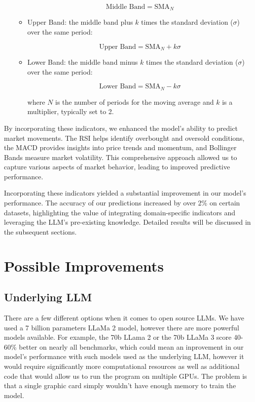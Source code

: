 \begin{itemize}
\begin{itemize}
		            \[
			            \text{Middle Band} = \text{SMA}_{N}
		            \]

		      \item Upper Band: the middle band plus \( k \) times the standard deviation (\( \sigma \)) over the same period:

		            \[
			            \text{Upper Band} = \text{SMA}_{N} + k\sigma
		            \]

		      \item Lower Band: the middle band minus \( k \) times the standard deviation (\( \sigma \)) over the same period:

		            \[
			            \text{Lower Band} = \text{SMA}_{N} - k\sigma
		            \]

		            where \( N \) is the number of periods for the moving average and \( k \) is a multiplier, typically set to 2.
	      \end{itemize}

\end{itemize}

By incorporating these indicators, we enhanced the model's ability to predict market movements. The RSI helps identify overbought and oversold conditions, the MACD provides insights into price trends and momentum, and Bollinger Bands measure market volatility. This comprehensive approach allowed us to capture various aspects of market behavior, leading to improved predictive performance.

Incorporating these indicators yielded a substantial improvement in our model's performance. The accuracy of our predictions increased by over 2\% on certain datasets, highlighting the value of integrating domain-specific indicators and leveraging the LLM's pre-existing knowledge. Detailed results will be discussed in the subsequent sections.

\section{Possible Improvements}

\subsection{Underlying LLM}
There are a few different options when it comes to open source LLMs. We have used a 7 billion parameters LLaMa 2 model, however there are more powerful models available. For example, the 70b LLama 2 or the 70b LLaMa 3 score 40-60\% better on nearly all benchmarks, which could mean an inprovement in our model's performance with such models used as the underlying LLM, however it would require significantly more computational resources as well as additional code that would allow us to run the program on multiple GPUs. The problem is that a single graphic card simply wouldn't have enough memory to train the model.

